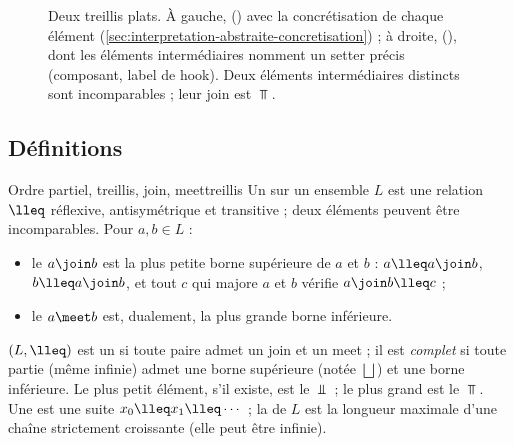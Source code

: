 \begin{figure}[htbp]\centering
{}
\caption{Deux treillis plats. À gauche, 
() avec la concrétisation de chaque élément
(\cref{sec:interpretation-abstraite-concretisation}) ; à droite, 
(), dont les éléments intermédiaires
nomment un setter précis (composant, label de hook). Deux éléments
intermédiaires distincts sont incomparables ; leur join est $\Top$.}
\label{fig:interpretation-abstraite-hasse-bool}
\end{figure}

\subsection{Définitions}

\begin{definition}{Ordre partiel, treillis, join, meet}{treillis}
  Un  sur un ensemble $L$ est une relation $\lleq$
  réflexive, antisymétrique et transitive ; deux éléments peuvent être
  incomparables. Pour $a, b \in L$ :
  \begin{itemize}
    \item le  $a \join b$ est la plus petite borne supérieure de
      $a$ et $b$ : $a \lleq a \join b$, $b \lleq a \join b$, et tout $c$ qui
      majore $a$ et $b$ vérifie $a \join b \lleq c$ ;
    \item le  $a \meet b$ est, dualement, la plus grande borne
      inférieure.
  \end{itemize}
  $(L, \lleq)$ est un  si toute paire admet un join et un meet ;
  il est \emph{complet} si toute partie (même infinie) admet une borne
  supérieure (notée $\bigsqcup$) et une borne inférieure. Le plus petit élément, s'il
  existe, est le  $\Bot$ ; le plus grand est le  $\Top$.
  Une  est une suite $x_0 \lleq x_1 \lleq \cdots$ ; la
   de $L$ est la longueur maximale d'une chaîne strictement
  croissante (elle peut être infinie).
\end{definition}

